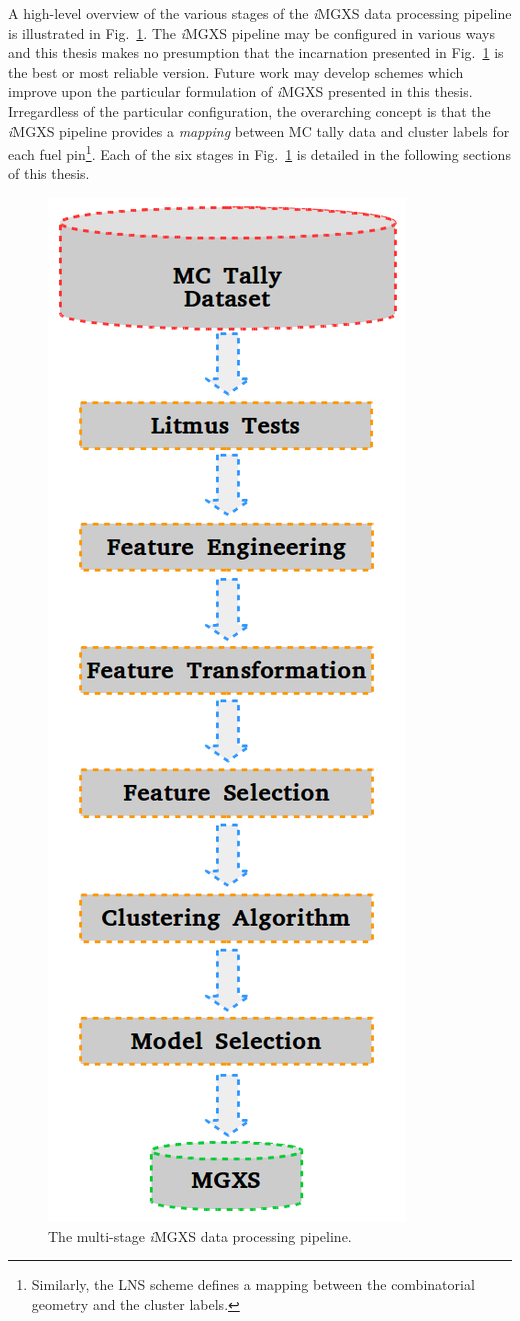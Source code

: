 A high-level overview of the various stages of the \textit{i}\ac{MGXS} data processing pipeline is illustrated in Fig.~\ref{fig:chap10-pipeline}. The \textit{i}\ac{MGXS} pipeline may be configured in various ways and this thesis makes no presumption that the incarnation presented in Fig.~\ref{fig:chap10-pipeline} is the best or most reliable version. Future work may develop schemes which improve upon the particular formulation of \textit{i}\ac{MGXS} presented in this thesis. Irregardless of the particular configuration, the overarching concept is that the \textit{i}\ac{MGXS} pipeline provides a \textit{mapping} between \ac{MC} tally data and cluster labels for each fuel pin\footnote{Similarly, the \ac{LNS} scheme defines a mapping between the combinatorial geometry and the cluster labels.}. Each of the six stages in Fig.~\ref{fig:chap10-pipeline} is detailed in the following sections of this thesis.

\begin{figure}[h!]
\centering
\includegraphics[width=0.35\linewidth]{figures/unsupervised/pipeline}
\vspace{2mm}
\caption[MGXS pipeline]{The multi-stage \textit{i}\ac{MGXS} data processing pipeline.}
\label{fig:chap10-pipeline}
\end{figure}


